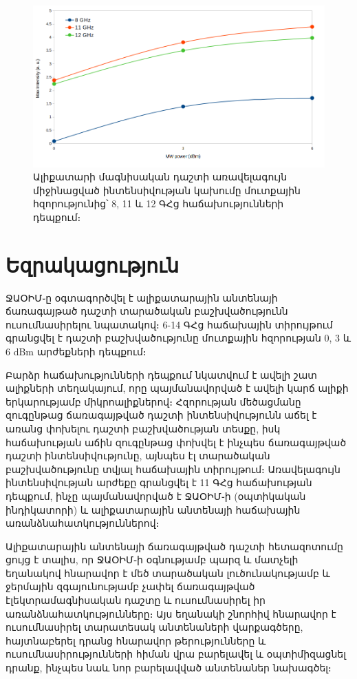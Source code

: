\documentclass[12pt, fleqn]{report}
\begin{document}
\begin{figure}
    \centering
    \includegraphics[width=1.0\textwidth]{data/experiment-results/free_field_of_antenna_0-6dBm_8-11-12GHz_generator_output_distance_5mm.png}
    \caption{Ալիքատարի մագնիսական դաշտի առավելագույն միջինացված ինտենսիվության կախումը մուտքային հզորությունից՝ 8, 11 և 12 ԳՀց հաճախությունների դեպքում։}
    \label{fig:MaxInt_vs_MWPower}
\end{figure}

\newpage

\section*{Եզրակացություն}

ՋԱՕԻՄ֊ը օգտագործվել է ալիքատարային անտենայի ճառագայթած դաշտի տարածական բաշխվածությունն ուսումնասիրելու նպատակով։ 6-14 ԳՀց հաճախային տիրույթում գրանցվել է դաշտի բաշխվածությունը մուտքային հզորության 0, 3 և 6 dBm արժեքների դեպքում։

Բարձր հաճախությունների դեպքում նկատվում է ավելի շատ ալիքների տեղակայում, որը պայմանավորված է ավելի կարճ ալիքի երկարությամբ միկրոալիքներով։ Հզորության մեծացմանը զուգընթաց ճառագայթված դաշտի ինտենսիվությունն աճել է առանց փոխելու դաշտի բաշխվածության տեսքը, իսկ հաճախության աճին զուգընթաց փոխվել է ինչպես ճառագայթված դաշտի ինտենսիվությունը, այնպես էլ տարածական բաշխվածությունը տվյալ հաճախային տիրույթում։ Առավելագույն ինտենսիվության արժեքը գրանցվել է 11 ԳՀց հաճախության դեպքում, ինչը պայմանավորված է ՋԱՕԻՄ֊ի (օպտիկական ինդիկատորի) և ալիքատարային անտենայի հաճախային առանձնահատկություններով։

Ալիքատարային անտենայի ճառագայթված դաշտի հետազոտումը ցույց է տալիս, որ ՋԱՕԻՄ֊ի օգնությամբ պարզ և մատչելի եղանակով հնարավոր է մեծ տարածական լուծունակությամբ և ջերմային զգայունությամբ չափել ճառագայթված էլեկտրամագնիսական դաշտը և ուսումնասիրել իր առանձնահատկությունները։ Այս եղանակի շնորհիվ հնարավոր է ուսումնասիրել տարատեսակ անտենաների վարքագծերը, հայտնաբերել դրանց հնարավոր թերությունները և ուսումնասիրությունների հիման վրա բարելավել և օպտիմիզացնել դրանք, ինչպես նաև նոր բարելավված անտենաներ նախագծել։
\end{document}
